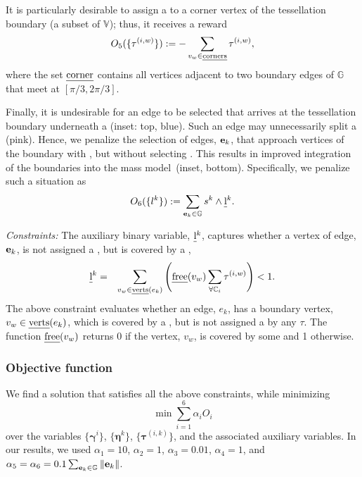 It is particularly desirable to assign a \buildingfacadepoint to a corner vertex of the tessellation boundary (a subset of $\mathbb{V}$); thus, it receives a reward
$$
O_5 ( \{ \tau^{(i,w)} \} ) := -  \sum_{v_w \in \text{\emph{corners}}} \tau^{(i,w)},
$$ 
%
where the set $\text{\emph{corner}}$ contains all vertices adjacent to two boundary edges of $\mathbb{G}$ that meet at $[\pi/3,2\pi/3]$.  

%


%
\pagebreak

\begin{figure}
\hspace*{-.2in}
  \def\svgwidth{0.26\columnwidth}  
    
\end{figure}
Finally, it is undesirable for an edge to be selected that arrives at the tessellation boundary underneath a \buildingfacade (inset: top, blue).
Such an edge may unnecessarily split a \footprintpolygon (pink). Hence, we penalize the selection of edges, $\mathbf{e}_k$, that approach vertices of the boundary with \buildingfacades, but without selecting  \buildingfacadepoints. This results in improved integration of the \facade boundaries into the mass model~(inset, bottom). 
%
Specifically, we penalize such a situation as %
% 
$$
O_6 ( \{ l^k \}) :=  \sum_{\mathbf{e}_k \in \mathbb{G}} s{}^k \land \text{\emph{l}}{}^k.
$$
% 

{\noindent \em Constraints:} %
%
The auxiliary binary variable, $\text{\emph{l}}{}^k$, captures whether a vertex of edge, $\mathbf{e}_k$, is not assigned a \buildingfacadepoint, but is covered by a \buildingfacade,
%
\begin{eqnarray*}
  \text{\emph{l}}{}^k &=& \sum_{v_w \in \text{\emph{verts}}(e_k)} \left(\text{\emph{free}}(v_w) \sum_{\forall \mathbb{C}_i  } \tau^{(i,w)}\right) < 1.
\end{eqnarray*}
%
  The above constraint evaluates whether an edge, $e_k$, has a boundary vertex, $v_w \in \text{\emph{verts}}(e_k)$, which is covered by a \buildingfacade, but is not assigned a \buildingfacadepoint by any $\tau$. The function $\text{\emph{free}}(v_w)$ returns 0 if the vertex, $v_w$, is covered by some \buildingfacade and 1 otherwise.

\subsubsection{Objective function} We find a solution that satisfies all the above constraints, while minimizing
$$
\min \sum_{i=1}^{6} \alpha_i {O_i}
$$ 
over the variables $\{ \mathbold{\gamma}^i \}$, $\{\mathbold{\eta}^k\}$, $\{\mathbold{\tau}^{(i,k)}\}$, and the associated auxiliary variables.
% 
In our results, we used $\alpha_1=10$, $\alpha_2=1$, $\alpha_3=0.01$, $\alpha_4=1$, and 
$\alpha_5 = \alpha_6 =  0.1 \sum_{\mathbf{e}_k \in \mathbb{G}} \|\mathbf{e}_k\|$.



